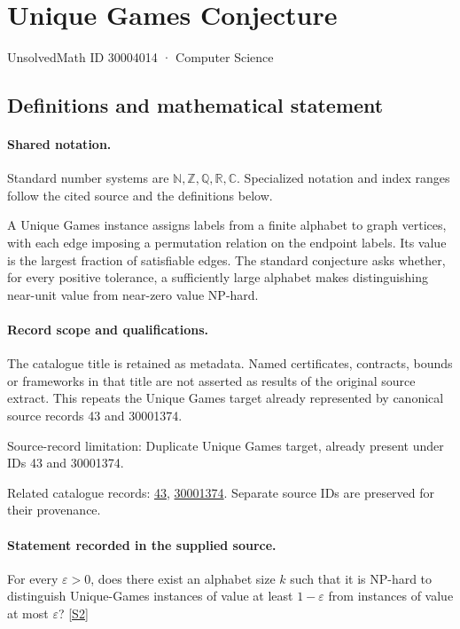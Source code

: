\documentclass[11pt]{article}
\newcommand{\sref}[2]{\hyperlink{source:#1:#2}{[S#2]}}
\begin{document}
\setcounter{section}{30004013}
\section{Unique Games Conjecture}\label{30004014}
{\small\sffamily UnsolvedMath ID 30004014 · Computer Science}
\subsection{Definitions and mathematical statement}

\paragraph{Shared notation.}Standard number systems are $\mathbb N,\mathbb Z,\mathbb Q,\mathbb R,\mathbb C$. Specialized notation and index ranges follow the cited source and the definitions below.


A Unique Games instance assigns labels from a finite alphabet to graph vertices, with each edge imposing a permutation relation on the endpoint labels. Its value is the largest fraction of satisfiable edges. The standard conjecture asks whether, for every positive tolerance, a sufficiently large alphabet makes distinguishing near-unit value from near-zero value NP-hard.
\paragraph{Record scope and qualifications.}
The catalogue title is retained as metadata. Named certificates, contracts, bounds or frameworks in that title are not asserted as results of the original source extract.
This repeats the Unique Games target already represented by canonical source records 43 and 30001374.

Source-record limitation: Duplicate Unique Games target, already present under IDs 43 and 30001374.

Related catalogue records: \href{https://mehmetmars7.github.io/Erdosproblems-llm-hunter/problem.html?type=open_problems&id=43}{43}, \href{https://mehmetmars7.github.io/Erdosproblems-llm-hunter/problem.html?type=open_problems&id=30001374}{30001374}. Separate source IDs are preserved for their provenance.
\paragraph{Statement recorded in the supplied source.}
For every $\varepsilon>0$, does there exist an alphabet size $k$ such that it is NP-hard to distinguish Unique-Games instances of value at least $1-\varepsilon$ from instances of value at most $\varepsilon$? \sref{30004014}{2}
\end{document}
